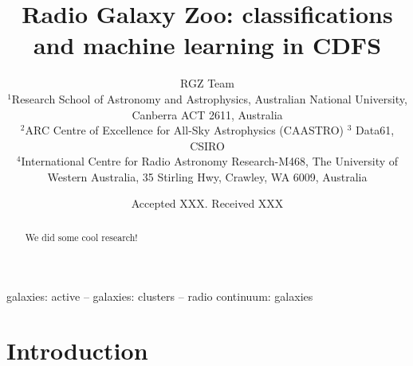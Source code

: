 \documentclass[fleqn,usenatbib,usedcolumn]{mnras}
\title[ML CDFS]{Radio Galaxy Zoo: classifications and machine learning in CDFS}
\author[RGZ Team]{RGZ Team
\\
$^{1}$Research School of Astronomy and Astrophysics, Australian National University, Canberra ACT 2611, Australia\\
$^{2}$ARC Centre of Excellence for All-Sky Astrophysics (CAASTRO)
$^{3}$ Data61, CSIRO\\
$^{4}$International Centre for Radio Astronomy Research-M468, The University of Western Australia, 35 Stirling Hwy, Crawley, WA 6009, Australia
}
\date{Accepted XXX. Received XXX}
\begin{document}
\label{firstpage}
\pagerange{\pageref{firstpage}--\pageref{lastpage}}
\maketitle

\begin{abstract}
We did some cool research!
\end{abstract}

\begin{keywords}
galaxies: active -- galaxies: clusters -- radio continuum: galaxies
\end{keywords}

\section{Introduction}

% 

%
%



\bsp	%
\label{lastpage}
\end{document}
